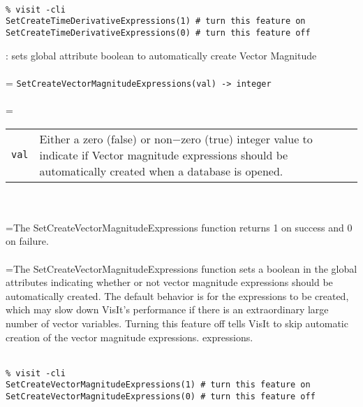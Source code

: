 \documentclass[10pt,a4paper]{report}
\begin{document}
\\[-6mm]
\begin{verbatim}% visit -cli
SetCreateTimeDerivativeExpressions(1) # turn this feature on
SetCreateTimeDerivativeExpressions(0) # turn this feature off
\end{verbatim}
\newpage


{}
: sets global attribute boolean to automatically create Vector Magnitude\\[-3mm]

 \\ 
\hangindent=\parindent 
\verb!SetCreateVectorMagnitudeExpressions(val) -> integer!\\ [-3mm]

 \\ 
\hangindent=\parindent 
\begin{tabular}{lp{9cm}}
\verb!val! & Either a zero (false) or non$-$zero (true) integer value to indicate if Vector magnitude expressions should be automatically created when a  database is opened. \\
\end{tabular} \\[-2mm]


 \\ 
\hangindent=\parindent The SetCreateVectorMagnitudeExpressions function returns 1 on success and 0 on failure. \\[-3mm] 

 \\ 
\hangindent=\parindent The SetCreateVectorMagnitudeExpressions function sets a boolean in the  global attributes indicating whether or not vector magnitude expressions  should be automatically created. The default behavior is for the  expressions to be created, which may slow down VisIt's performance  if there is an extraordinary large number of vector variables.  Turning this  feature off tells VisIt to skip automatic creation of the vector magnitude expressions.  expressions. \\[-3mm] 

\\[-6mm]
\begin{verbatim}% visit -cli
SetCreateVectorMagnitudeExpressions(1) # turn this feature on
SetCreateVectorMagnitudeExpressions(0) # turn this feature off
\end{verbatim}
\newpage
\end{document}
